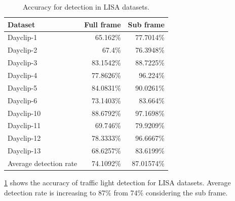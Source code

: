 \begin{table}[h!]
  \centering
 
  
  \begin{tabular}{  l  r  r }
    \rowcolor{gray!50}
    Dataset & Full frame & Sub frame \\
    \hline
    Dayclip-1 & 65.162\% & 77.7014\% \\
    Dayclip-2 & 67.4\% & 76.3948\% \\
    Dayclip-3 & 83.1542\% & 88.7225\% \\
    Dayclip-4 & 77.8626\% & 96.224\% \\
    Dayclip-5 & 84.0831\% & 90.0261\% \\
    Dayclip-6 & 73.1403\% & 83.664\% \\
    Dayclip-10 & 88.6792\% & 97.1698\% \\
    Dayclip-11 & 69.746\% & 79.9209\% \\
    Dayclip-12 & 78.3333\% & 96.6667\% \\
    Dayclip-13 & 68.6257\% & 83.6199\%\\
    \hline
    Average detection rate & 74.1092\% & 87.01574\% \\
  \end{tabular}
  \caption{Accuracy for detection in LISA datasets.}
  \label{t:lisa_acc_stat}
\end{table}

\ref{t:lisa_acc_stat} shows the accuracy of traffic light detection for LISA datasets.
Average detection rate is increasing to 87\% from 74\% considering the sub frame.





